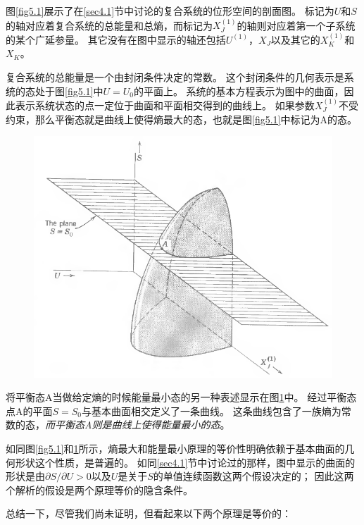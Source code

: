 图\ref{fig5.1}展示了在\ref{sec4.1}节中讨论的复合系统的位形空间的剖面图。
标记为$U$和$S$的轴对应着复合系统的总能量和总熵，而标记为$X_J^{(1)}$的轴则对应着第一个子系统的某个广延参量。
其它没有在图中显示的轴还包括$U^{(1)}$，$X_J$以及其它的$X_K^{(1)}$和$X_K$。

复合系统的总能量是一个由封闭条件决定的常数。
这个封闭条件的几何表示是系统的态处于图\ref{fig5.1}中$U=U_0$的平面上。
系统的基本方程表示为图中的曲面，因此表示系统状态的点一定位于曲面和平面相交得到的曲线上。
如果参数$X_J^{(1)}$不受约束，那么平衡态就是曲线上使得熵最大的态，也就是图\ref{fig5.1}中标记为A的态。

\begin{figure}[htbp]
\includegraphics[width=\textwidth]{Pictures/fig5.2.png}
\label{fig5.2}
\end{figure}

将平衡态A当做给定熵的时候能量最小态的另一种表述显示在图\ref{fig5.2}中。
经过平衡态点A的平面$S=S_0$与基本曲面相交定义了一条曲线。
这条曲线包含了一族熵为常数的态，{\it 而平衡态A则是曲线上使得能量最小的态}。

如同图\ref{fig5.1}和\ref{fig5.2}所示，熵最大和能量最小原理的等价性明确依赖于基本曲面的几何形状这个性质，是普遍的。
如同\ref{sec4.1}节中讨论过的那样，图中显示的曲面的形状是由$\partial S/\partial U>0$以及$U$是关于$S$的单值连续函数这两个假设决定的；
因此这两个解析的假设是两个原理等价的隐含条件。

总结一下，尽管我们尚未证明，但看起来以下两个原理是等价的：

